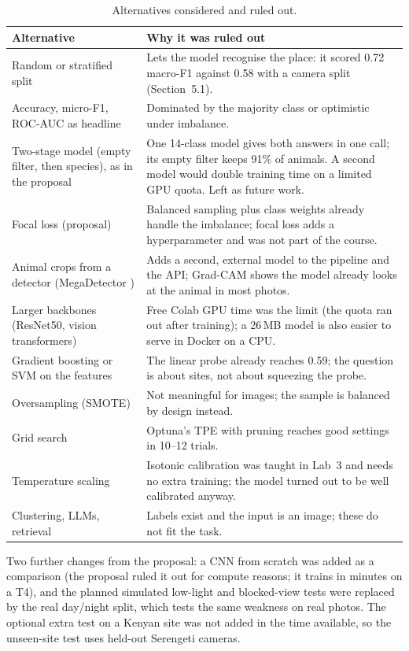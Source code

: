 \documentclass[11pt,a4paper]{article}
\begin{document}
\begin{table}[H]
\centering\small
\begin{tabularx}{\textwidth}{p{4.1cm}X}
\toprule
Alternative & Why it was ruled out \\
\midrule
Random or stratified split & Lets the model recognise the place: it scored 0.72 macro-F1 against 0.58
with a camera split (Section~5.1). \\
Accuracy, micro-F1, ROC-AUC as headline & Dominated by the majority class or optimistic under imbalance. \\
Two-stage model (empty filter, then species), as in the proposal & One 14-class model gives both answers in one call;
its empty filter keeps 91\% of animals. A second model would double training time on a limited GPU quota. Left as future work. \\
Focal loss (proposal) & Balanced sampling plus class weights already handle the imbalance; focal loss adds a hyperparameter and was not part of the course. \\
Animal crops from a detector (MegaDetector \cite{beery2019}) & Adds a second, external model to the pipeline and the API; Grad-CAM shows the model already looks at the animal in most photos. \\
Larger backbones (ResNet50, vision transformers) & Free Colab GPU time was the limit (the quota ran out after training); a 26\,MB model is also easier to serve in Docker on a CPU. \\
Gradient boosting or SVM on the features & The linear probe already reaches 0.59; the question is about sites, not about squeezing the probe. \\
Oversampling (SMOTE) & Not meaningful for images; the sample is balanced by design instead. \\
Grid search & Optuna's TPE with pruning reaches good settings in 10--12 trials. \\
Temperature scaling & Isotonic calibration was taught in Lab~3 and needs no extra training; the model turned out to be well calibrated anyway. \\
Clustering, LLMs, retrieval & Labels exist and the input is an image; these do not fit the task. \\
\bottomrule
\end{tabularx}
\caption{Alternatives considered and ruled out.}
\end{table}

Two further changes from the proposal: a CNN from scratch was added as a comparison (the proposal ruled
it out for compute reasons; it trains in minutes on a T4), and the planned simulated low-light and
blocked-view tests were replaced by the real day/night split, which tests the same weakness on real photos.
The optional extra test on a Kenyan site was not added in the time available, so the unseen-site test uses
held-out Serengeti cameras.
\end{document}
